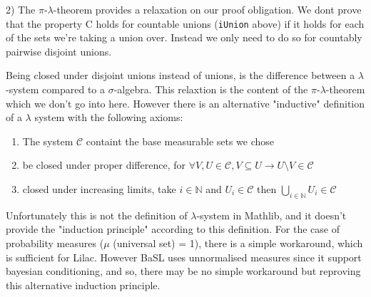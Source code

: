 2) The $\pi$-$\lambda$-theorem provides a relaxation on our proof obligation. We dont prove that the property C holds for countable unions 
(\texttt{iUnion} above) if it holds for each of the sets we're taking a union over. Instead we only need to do so for countably pairwise disjoint unions.

Being closed under disjoint unions instead of unions, is the difference between a $\lambda$-system compared to a $\sigma$-algebra. This relaxtion is the 
content of the $\pi$-$\lambda$-theorem which we don't go into here.
However there is an alternative "inductive" definition of a $\lambda$ system with the following axioms: 
\begin{enumerate}
\item The system $\mathcal{C}$ containt the base measurable sets we chose
\item be closed under proper difference, for $\forall V, U \in \mathcal{C}, V \subseteq U \rightarrow U \setminus V \in \mathcal{C}$
\item closed under increasing limits, take $i \in \mathbb{N}$ and $U_i \in \mathcal{C}$ then $\bigcup_{i \in \mathbb{N}} U_i \in \mathcal{C}$
\end{enumerate}

Unfortunately this is not the definition of $\lambda$-system in Mathlib, and it doesn't provide the "induction principle" according to this definition.
For the case of probability measures ($\mu$ (universal set) = 1), there is a simple workaround, which is sufficient for Lilac. However BaSL uses unnormalised
measures since it support bayesian conditioning, and so, there may be no simple workaround but reproving this alternative induction principle.


